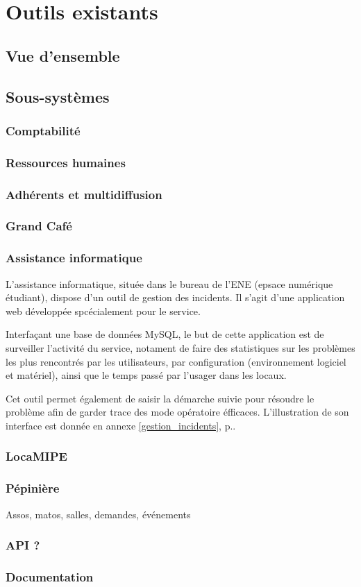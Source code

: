 \section{Outils existants}
\subsection{Vue d'ensemble}
\subsection{Sous-systèmes}
\subsubsection{Comptabilité}
\subsubsection{Ressources humaines}
\subsubsection{Adhérents et multidiffusion}
\subsubsection{Grand Café}
\subsubsection{Assistance informatique}
L'assistance informatique, située dans le bureau de l'ENE (epsace numérique étudiant), dispose d'un outil de gestion des incidents. Il s'agit d'une application web développée spcécialement pour le service.

Interfaçant une base de données MySQL, le but de cette application est de surveiller l'activité du service, notament de faire des statistiques sur les 
problèmes les plus rencontrés par les utilisateurs, par configuration (environnement logiciel et matériel), ainsi que le temps passé par l'usager
dans les locaux.

Cet outil permet également de saisir la démarche suivie pour résoudre le problème afin de garder trace des mode opératoire éfficaces. L'illustration de son interface est donnée en annexe \ref{gestion_incidents}, p.\pageref{gestion_incidents}.

\subsubsection{LocaMIPE}
\subsubsection{Pépinière}
Assos, matos, salles, demandes, événements
\subsubsection{API ?}
\subsubsection{Documentation}
